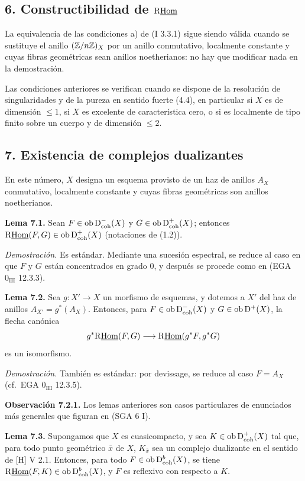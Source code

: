 \subsection*{6. Constructibilidad de $\mathrm{R}\underline{\operatorname{Hom}}$}

La equivalencia de las condiciones a) de (I 3.3.1) sigue siendo válida cuando se sustituye el anillo $(\mathbb{Z}/n\mathbb{Z})_X$ por un anillo conmutativo, localmente constante y cuyas fibras geométricas sean anillos noetherianos: no hay que modificar nada en la demostración.

Las condiciones anteriores se verifican cuando se dispone de la resolución de singularidades y de la pureza en sentido fuerte (4.4), en particular si $X$ es de dimensión $\leq1$, si $X$ es excelente de característica cero, o si es localmente de tipo finito sobre un cuerpo y de dimensión $\leq2$.

\subsection*{7. Existencia de complejos dualizantes}

En este número, $X$ designa un esquema provisto de un haz de anillos $A_X$ conmutativo, localmente constante y cuyas fibras geométricas son anillos noetherianos.

\textbf{Lema 7.1.} Sean $F\in\operatorname{ob}\mathrm{D}^{-}_{\mathrm{coh}}(X)$ y $G\in\operatorname{ob}\mathrm{D}^{+}_{\mathrm{coh}}(X)$; entonces $\mathrm{R}\underline{\operatorname{Hom}}(F,G)\in\operatorname{ob}\mathrm{D}^{+}_{\mathrm{coh}}(X)$ (notaciones de (1.2)).

\emph{Demostración.} Es estándar. Mediante una sucesión espectral, se reduce al caso en que $F$ y $G$ están concentrados en grado $0$, y después se procede como en (EGA $0_{\mathrm{III}}$ 12.3.3).

\textbf{Lema 7.2.} Sea $g:X'\to X$ un morfismo de esquemas, y dotemos a $X'$ del haz de anillos $A_{X'}=g^*(A_X)$. Entonces, para $F\in\operatorname{ob}\mathrm{D}^{-}_{\mathrm{coh}}(X)$ y $G\in\operatorname{ob}\mathrm{D}^{+}(X)$, la flecha canónica
\[
        g^*\mathrm{R}\underline{\operatorname{Hom}}(F,G)\longrightarrow \mathrm{R}\underline{\operatorname{Hom}}(g^*F,g^*G)
\]
es un isomorfismo.

\emph{Demostración.} También es estándar: por devissage, se reduce al caso $F=A_X$ (cf.~EGA $0_{\mathrm{III}}$ 12.3.5).

\textbf{Observación 7.2.1.} Los lemas anteriores son casos particulares de enunciados más generales que figuran en (SGA 6 I).

\textbf{Lema 7.3.} Supongamos que $X$ es cuasicompacto, y sea $K\in\operatorname{ob}\mathrm{D}^{+}_{\mathrm{coh}}(X)$ tal que, para todo punto geométrico $\bar{x}$ de $X$, $K_{\bar{x}}$ sea un complejo dualizante en el sentido de [H] V 2.1. Entonces, para todo $F\in\operatorname{ob}\mathrm{D}^{b}_{\mathrm{coh}}(X)$, se tiene $\mathrm{R}\underline{\operatorname{Hom}}(F,K)\in\operatorname{ob}\mathrm{D}^{b}_{\mathrm{coh}}(X)$, y $F$ es reflexivo con respecto a $K$.

